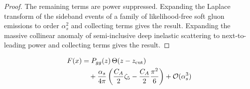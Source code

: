 \begin{proof}
The remaining terms are power suppressed. Expanding the Laplace
transform of the sideband events of a family of likelihood-free soft
gluon emissions to order $\alpha_s^2$ and collecting terms gives the
result. Expanding the massive collinear anomaly of semi-inclusive deep
inelastic scattering to next-to-leading power and collecting terms gives
the result.
\end{proof}

\begin{align}
  F(x) &= P_{gg}(z) \, \Theta(z - z_{\rm cut}) \nonumber \\
  &\quad + \frac{\alpha_s}{4\pi} \left( \frac{C_A}{2} \zeta_{5} - \frac{C_A}{2} \frac{\pi^2}{6} \right) + \mathcal{O}(\alpha_s^3) \label{eq:6}
\end{align}

